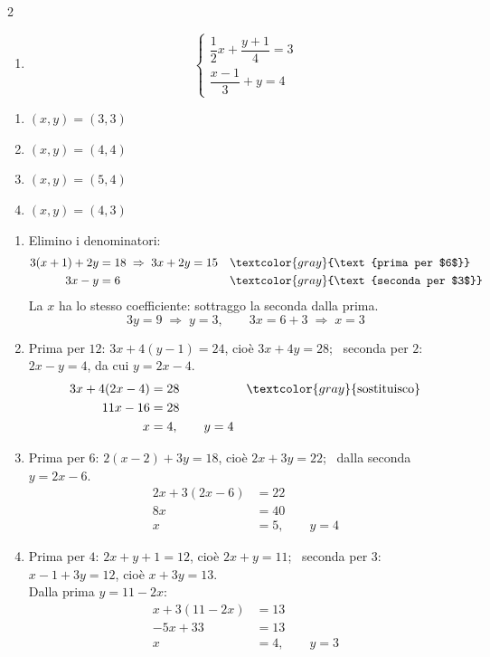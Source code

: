 \begin{question}[ID=2.2, subtitle={Sistemi con frazioni e numeratori letterali}, difficulty=media, tags={sistemi, equazioni lineari, frazioni}]
\begin{multicols}{2}
\begin{enumerate}[leftmargin=3.2cm]
    \item
    \[
    \begin{cases}
    \dfrac{1}{2}x+\dfrac{y+1}{4}=3\\
    \dfrac{x-1}{3}+y=4
    \end{cases}
    \]
\end{enumerate}
\end{multicols}
\begin{solution}
\begin{enumerate}
    \item $(x,y)=(3,3)$
    \item $(x,y)=(4,4)$
    \item $(x,y)=(5,4)$
    \item $(x,y)=(4,3)$
\end{enumerate}
\end{solution}
\begin{explanation}
\begin{enumerate}
    \item Elimino i denominatori:
    \[\begin{aligned}
    3(x+1)+2y &= 18 \;\Rightarrow\; 3x+2y=15 && \textcolor{gray}{\text{prima per $6$}}\\
    3x-y &= 6 && \textcolor{gray}{\text{seconda per $3$}}
    \end{aligned}\]
    La $x$ ha lo stesso coefficiente: sottraggo la seconda dalla prima.
    \[ 3y=9 \;\Rightarrow\; y=3, \qquad 3x=6+3 \;\Rightarrow\; x=3 \]
    \item Prima per $12$: $3x+4(y-1)=24$, cioè $3x+4y=28$; \ seconda per $2$: $2x-y=4$, da cui $y=2x-4$.
    \[\begin{aligned}
    3x+4(2x-4) &= 28 && \textcolor{gray}{\text{sostituisco}}\\
    11x-16 &= 28\\
    x &= 4, \qquad y=4
    \end{aligned}\]
    \item Prima per $6$: $2(x-2)+3y=18$, cioè $2x+3y=22$; \ dalla seconda $y=2x-6$.
    \[\begin{aligned}
    2x+3(2x-6) &= 22\\
    8x &= 40\\
    x &= 5, \qquad y=4
    \end{aligned}\]
    \item Prima per $4$: $2x+y+1=12$, cioè $2x+y=11$; \ seconda per $3$: $x-1+3y=12$, cioè $x+3y=13$. \\
    Dalla prima $y=11-2x$:
    \[\begin{aligned}
    x+3(11-2x) &= 13\\
    -5x+33 &= 13\\
    x &= 4, \qquad y=3
    \end{aligned}\]
\end{enumerate}
\end{explanation}
\end{question}

